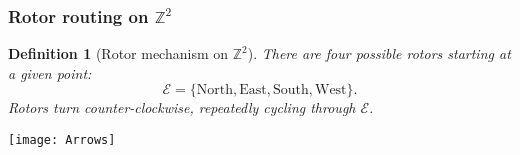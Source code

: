 \documentclass{beamer}
\newtheorem{defn}{Definition}
\begin{document}

	

 
 \begin{frame}
 	\frametitle{Rotor routing on $\mathbb{Z}^2$}
	
	\pause
	
	\begin{defn}[Rotor mechanism on $\mathbb{Z}^2$]
		There are four possible rotors starting at a given point: $$\mathcal{E} = \{\text{North}, \text{East}, \text{South}, \text{West} \}.$$ Rotors turn counter-clockwise, repeatedly cycling through $\mathcal{E}$.
	\end{defn}
 \pause
 \texttt{[image: Arrows]}

 \end{frame}
 
 
	
 
 

	
\end{document}
